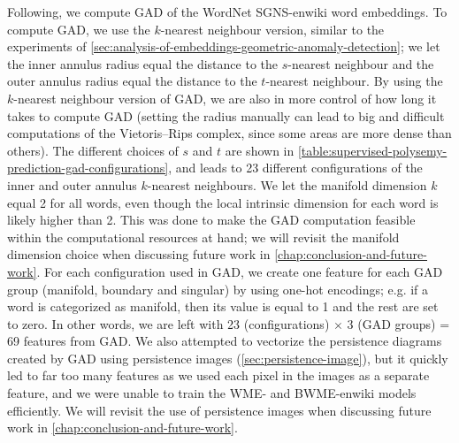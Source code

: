 Following, we compute GAD of the WordNet SGNS-enwiki word embeddings. To compute GAD, we use the $k$-nearest neighbour version, similar to the experiments of \cref{sec:analysis-of-embeddings-geometric-anomaly-detection}; we let the inner annulus radius equal the distance to the $s$-nearest neighbour and the outer annulus radius equal the distance to the $t$-nearest neighbour. By using the $k$-nearest neighbour version of GAD, we are also in more control of how long it takes to compute GAD (setting the radius manually can lead to big and difficult computations of the Vietoris–Rips complex, since some areas are more dense than others). The different choices of $s$ and $t$ are shown in \cref{table:supervised-polysemy-prediction-gad-configurations}, and leads to 23 different configurations of the inner and outer annulus $k$-nearest neighbours. We let the manifold dimension $k$ equal 2 for all words, even though the local intrinsic dimension for each word is likely higher than 2. This was done to make the GAD computation feasible within the computational resources at hand; we will revisit the manifold dimension choice when discussing future work in \cref{chap:conclusion-and-future-work}. For each configuration used in GAD, we create one feature for each GAD group (manifold, boundary and singular) by using one-hot encodings; e.g. if a word is categorized as manifold, then its value is equal to 1 and the rest are set to zero. In other words, we are left with 23 (configurations) $\times$ 3 (GAD groups) = 69 features from GAD. We also attempted to vectorize the persistence diagrams created by GAD using persistence images (\cref{sec:persistence-image}), but it quickly led to far too many features as we used each pixel in the images as a separate feature, and we were unable to train the WME- and BWME-enwiki models efficiently. We will revisit the use of persistence images when discussing future work in \cref{chap:conclusion-and-future-work}.
